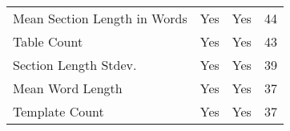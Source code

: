 \begin{table}[htbp]
\begin{tabular}{m{} c c c}
        Mean Section Length in Words & Yes & Yes & 44 \\
        Table Count & Yes & Yes & 43 \\
        Section Length Stdev. & Yes & Yes & 39 \\
        Mean Word Length & Yes & Yes & 37 \\
        Template Count & Yes & Yes & 37 \\
        \bottomrule
    \end{tabular}
\end{table}